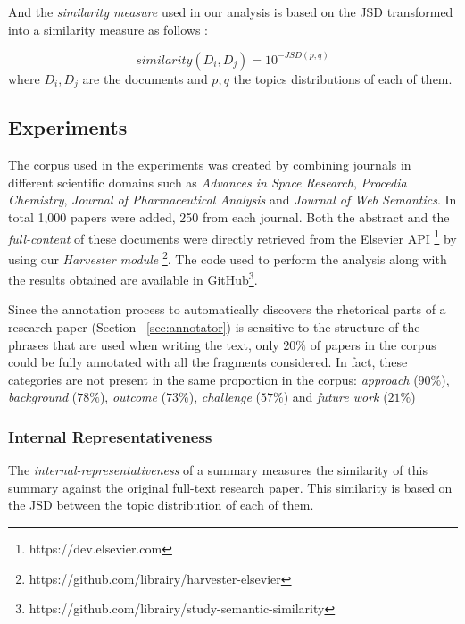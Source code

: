 And the \textit{similarity measure} used in our analysis is based on the JSD transformed into a similarity measure as follows \citep{Dagan1998} :

\begin{equation}
similarity(D_i , D_j) = 10^{- JSD(p,q)}
\label{eq:simcontent}
\end{equation}
where  $D_i,D_j$ are the documents and $p,q$ the topics distributions of each of them.

\subsection{Experiments}
\label{sec:topic-relevance-experiments}

The corpus used in the experiments was created by combining journals in different scientific domains such as \textit{Advances in Space Research}, \textit{Procedia Chemistry}, \textit{Journal of Pharmaceutical Analysis} and \textit{Journal of Web Semantics}. In total 1,000 papers were added, 250 from each journal. Both the abstract and the \textit{full-content} of these documents were directly retrieved from the Elsevier API \footnote{https://dev.elsevier.com} by using our \textit{Harvester module} \footnote{https://github.com/librairy/harvester-elsevier}. The code used to perform the analysis along with the results obtained are available in GitHub\footnote{https://github.com/librairy/study-semantic-similarity}.

Since the annotation process to automatically discovers the rhetorical parts of a research paper (Section ~\ref{sec:annotator}) is sensitive to the structure of the phrases that are used when writing the text, only $20\%$ of papers in the corpus could be fully annotated with all the fragments considered. In fact, these categories are not present in the same proportion in the corpus: \textit{approach} ($90\%$), \textit{background} ($78\%$), \textit{outcome} ($73\%$), \textit{challenge} ($57\%$) and \textit{future work} ($21\%$)

\subsubsection{Internal Representativeness}

The \textit{internal-representativeness} of a summary measures the similarity of this summary against the original full-text research paper. This similarity is based on the JSD between the topic distribution of each of them. 

